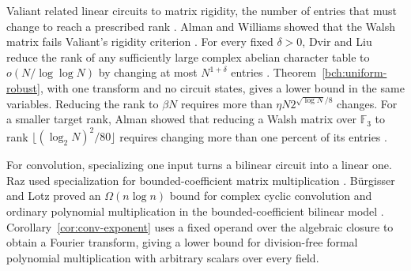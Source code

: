 Valiant related linear circuits to matrix rigidity, the number of
entries that must change to reach a prescribed rank
\cite{Valiant1975,Valiant1977}. Alman and Williams showed that the
Walsh matrix fails Valiant's rigidity criterion \cite{AlmanWilliamsRigidity}.
For every fixed $\delta>0$, Dvir and Liu reduce the rank of any
sufficiently large complex abelian character table to
$o(N/\log\log N)$ by changing at most $N^{1+\delta}$ entries
\cite[Theorem~6.1]{DvirLiu}. Theorem~\ref{bch:uniform-robust},
with one transform and no circuit states, gives a lower bound in the
same variables. Reducing the rank to $\beta N$ requires more than
$\eta N2^{\sqrt{\log N}/8}$ changes. For a smaller target rank, Alman
showed that reducing a Walsh matrix over $\mathbb F_3$ to rank
$\lfloor(\log_2 N)^2/80\rfloor$ requires changing more than one percent
of its entries \cite{AlmanRigidity}.

For convolution, specializing one input turns a bilinear circuit into
a linear one. Raz used specialization for bounded-coefficient matrix
multiplication \cite{Raz}. B\"urgisser and Lotz proved an
$\Omega(n\log n)$ bound for complex cyclic convolution and ordinary
polynomial multiplication in the bounded-coefficient bilinear model
\cite{BurgisserLotz}.
Corollary~\ref{cor:conv-exponent} uses a fixed operand over the algebraic
closure to obtain a Fourier transform, giving a lower bound for
division-free formal polynomial multiplication with arbitrary scalars
over every field.
